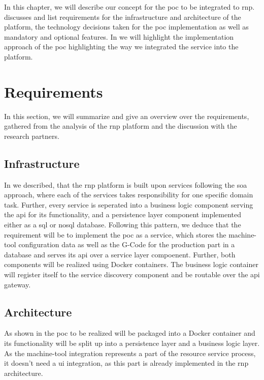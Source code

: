 \documentclass[
a4paper,
twoside,
headsepline,
cleardoublepage=empty,
parskip=half,
draft=false
]{scrbook}
\begin{document}
		In this chapter, we will describe our concept for the \gls{poc} to be integrated to \gls{rnp}.
		 discusses and list requirements for the infrastructure and architecture of the platform, the technology decisions taken for the \gls{poc} implementation as well as mandatory and optional features. In  we will highlight the implementation approach of the \gls{poc} highlighting the way we integrated the service into the platform. 
		
		\section{Requirements} \label{sec:requirements}
		
			In this section, we will summarize and give an overview over the requirements, gathered from the analysis of the \gls{rnp} platform and the discussion with the research partners.
		
			\subsection{Infrastructure} \label{subsec:infrastructure}
			
				In  we described, that the \gls{rnp} platform is built upon services following the \gls{soa} approach, where each of the services takes responsibility for one specific domain task.
				Further, every service is seperated into a business logic component serving the \gls{api} for its functionality, and a persistence layer component implemented either as a \gls{sql} or \gls{nosql} database.
				Following this pattern, we deduce that the requirement will be to implement the \gls{poc} as a service, which stores the machine-tool configuration data as well as the G-Code for the production part in a database and serves its \gls{api} over a service layer compoenent.
				Further, both components will be realized using Docker containers.
				The business logic container will register itself to the service discovery component and be routable over the \gls{api} gateway.
			
			\subsection{Architecture} \label{subsec:architecture}
			
				As shown in  the \gls{poc} to be realized will be packaged into a Docker container and its functionality will be split up into a persistence layer and a business logic layer.
				As the machine-tool integration represents a part of the resource service process, it doesn't need a \gls{ui} integration, as this part is already implemented in the \gls{rnp} architecture.
				
\end{document}
